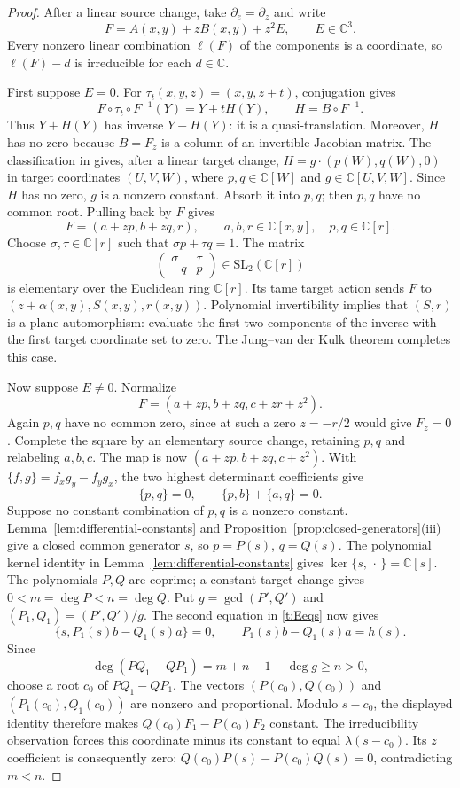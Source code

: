 \documentclass[11pt,reqno]{amsart}
\numberwithin{equation}{section}
\theoremstyle{plain}
\theoremstyle{definition}
\theoremstyle{remark}
\newcommand{\C}{\mathbb C}
\newcommand{\br}[2]{\{#1,#2\}}
\begin{document}
\begin{proof}
After a linear source change, take $\partial_e=\partial_z$ and write
\[
 F=A(x,y)+zB(x,y)+z^2E,
 \qquad E\in\C^3.
\]
Every nonzero linear combination $\ell(F)$ of the components is a
coordinate, so $\ell(F)-d$ is irreducible for each $d\in\C$.

First suppose $E=0$. For $\tau_t(x,y,z)=(x,y,z+t)$, conjugation gives
\[
 F\circ\tau_t\circ F^{-1}(Y)=Y+tH(Y),\qquad H=B\circ F^{-1}.
\]
Thus $Y+H(Y)$ has inverse $Y-H(Y)$: it is a quasi-translation.
Moreover, $H$ has no zero because $B=F_z$ is a column of an invertible
Jacobian matrix. The classification in \cite[Corollary 5.8]{QT} gives,
after a linear target change, $H=g\cdot(p(W),q(W),0)$ in target coordinates
$(U,V,W)$, where $p,q\in\C[W]$ and $g\in\C[U,V,W]$.
Since $H$ has no zero, $g$ is a nonzero constant. Absorb it into $p,q$;
then $p,q$ have no common root. Pulling back by $F$ gives
\[
 F=(a+zp,b+zq,r),\qquad a,b,r\in\C[x,y],\quad p,q\in\C[r].
\]
Choose $\sigma,\tau\in\C[r]$ such that $\sigma p+\tau q=1$. The matrix
\[
 \begin{pmatrix}\sigma&\tau\\-q&p\end{pmatrix}\in\mathrm{SL}_2(\C[r])
\]
is elementary over the Euclidean ring $\C[r]$. Its tame target action sends $F$ to
$(z+\alpha(x,y),S(x,y),r(x,y))$. Polynomial invertibility implies that $(S,r)$
is a plane automorphism: evaluate the first two components of the inverse with
the first target coordinate set to zero. The Jung--van der Kulk theorem completes this case.

Now suppose $E\ne0$. Normalize
\[
 F=(a+zp,b+zq,c+zr+z^2).
\]
Again $p,q$ have no common zero, since at such a zero $z=-r/2$ would give $F_z=0$.
Complete the square by an elementary source change, retaining $p,q$ and
relabeling $a,b,c$. The map is now $(a+zp,b+zq,c+z^2)$.
With $\br fg=f_xg_y-f_yg_x$, the two highest determinant coefficients give
\begin{equation}\label{t:Eeqs}
 \br pq=0,\qquad \br pb+\br aq=0.
\end{equation}
Suppose no constant combination of $p,q$ is a nonzero constant.
Lemma~\ref{lem:differential-constants} and
Proposition~\ref{prop:closed-generators}(iii) give a closed common
generator $s$, so $p=P(s)$, $q=Q(s)$.
The polynomial kernel identity in Lemma~\ref{lem:differential-constants} gives
$\ker\br s{\,\cdot\,}=\C[s]$.
The polynomials $P,Q$ are coprime; a constant target change gives
$0<m=\deg P<n=\deg Q$.
Put $g=\gcd(P',Q')$ and $(P_1,Q_1)=(P',Q')/g$.
The second equation in \eqref{t:Eeqs} now gives
\[
 \br s{P_1(s)b-Q_1(s)a}=0,
 \qquad P_1(s)b-Q_1(s)a=h(s).
\]
Since
\[
 \deg(PQ_1-QP_1)=m+n-1-\deg g\ge n>0,
\]
choose a root $c_0$ of $PQ_1-QP_1$.
The vectors $(P(c_0),Q(c_0))$ and $(P_1(c_0),Q_1(c_0))$ are nonzero
and proportional. Modulo $s-c_0$, the displayed identity therefore makes
$Q(c_0)F_1-P(c_0)F_2$ constant.
The irreducibility observation forces this coordinate minus its constant
to equal $\lambda(s-c_0)$. Its $z$ coefficient is consequently zero:
$Q(c_0)P(s)-P(c_0)Q(s)=0$, contradicting $m<n$.


\end{proof}
\end{document}
